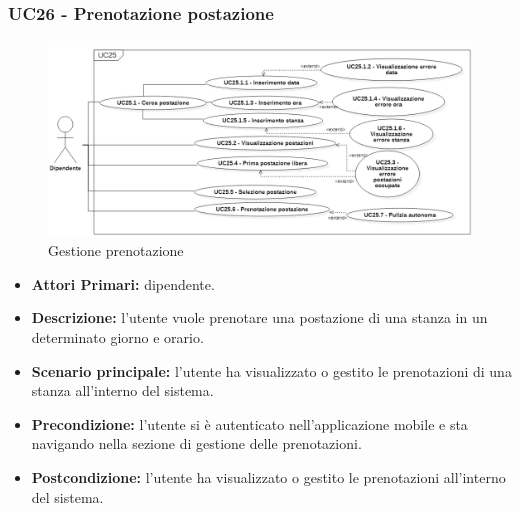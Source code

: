 \subsubsection{ UC26 - Prenotazione postazione }
\begin{figure}[H]
	\centering
	\includegraphics[width=18cm]{res/images/UC24.png}
	\caption{Gestione prenotazione}
	\label{fig:Gestione prenotazione}
\end{figure}
\begin{itemize}
	\item\textbf{Attori Primari:} dipendente.
	\item\textbf{Descrizione:} l’utente vuole prenotare una postazione di una stanza in un determinato giorno e orario.
	\item\textbf{Scenario principale:} l’utente ha visualizzato o gestito le prenotazioni di una stanza all’interno del sistema.
	\item\textbf{Precondizione:} l’utente si è autenticato nell'applicazione mobile e sta navigando nella sezione di gestione delle prenotazioni.
	\item\textbf{Postcondizione:} l’utente ha visualizzato o gestito le prenotazioni all’interno del sistema.
\end{itemize}
